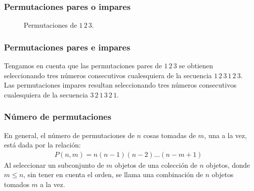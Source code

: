 \documentclass[12pt]{beamer}
\begin{document}
\begin{frame}
\frametitle{Permutaciones pares o impares}
\begin{figure}[H]
\centering
{}
\hspace{2cm}
\caption{Permutaciones de $1 \, 2 \, 3$.}
\label{fig:figura_01_01}
\end{figure}
\end{frame}
\begin{frame}
\frametitle{Permutaciones pares e impares}
Tengamos en cuenta que las permutaciones pares de $1 \, 2 \, 3$ se obtienen seleccionando tres números consecutivos cualesquiera de la secuencia $1 \, 2 \, 3\, 1 \, 2 \, 3$.
\\
\bigskip
\pause
Las permutaciones impares resultan seleccionando tres números consecutivos cualesquiera de la secuencia $3 \, 2 \, 1 \, 3 \, 2 \, 1$.
\end{frame}
\begin{frame}
\frametitle{Número de permutaciones}
 En general, el número de permutaciones de $n$ cosas tomadas de $m$, una a la vez, está dada por la relación:
\begin{align*}
P(n, m) = n (n - 1)(n - 2) \ldots (n - m +1)
\end{align*}
Al seleccionar un subconjunto de $m$ objetos de una colección de $n$ objetos, donde $m \leq n$, sin tener en cuenta el orden, se llama una combinación de $n$ objetos tomados $m$ a la vez.
\end{frame}
\end{document}

